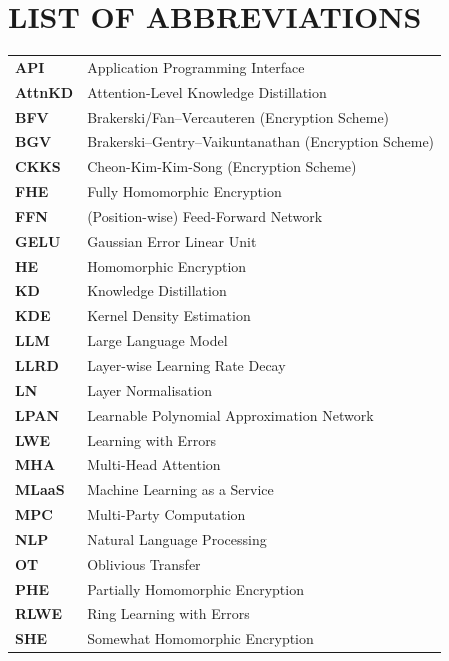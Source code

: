 \chapter*{LIST OF ABBREVIATIONS}
\vspace{2\baselineskip}

\noindent
\begin{tabular}{@{}p{3cm}p{11.5cm}@{}}
\textbf{API}   & Application Programming Interface \\
\textbf{AttnKD} & Attention-Level Knowledge Distillation \\
\textbf{BFV}   & Brakerski/Fan--Vercauteren (Encryption Scheme) \\
\textbf{BGV}   & Brakerski--Gentry--Vaikuntanathan (Encryption Scheme) \\
\textbf{CKKS}  & Cheon-Kim-Kim-Song (Encryption Scheme) \\
\textbf{FHE}   & Fully Homomorphic Encryption \\
\textbf{FFN}   & (Position-wise) Feed-Forward Network \\
\textbf{GELU}  & Gaussian Error Linear Unit \\
\textbf{HE}    & Homomorphic Encryption \\
\textbf{KD}    & Knowledge Distillation \\
\textbf{KDE}   & Kernel Density Estimation \\
\textbf{LLM}   & Large Language Model \\
\textbf{LLRD}  & Layer-wise Learning Rate Decay \\
\textbf{LN}    & Layer Normalisation \\
\textbf{LPAN}  & Learnable Polynomial Approximation Network \\
\textbf{LWE}   & Learning with Errors \\
\textbf{MHA}   & Multi-Head Attention \\
\textbf{MLaaS} & Machine Learning as a Service \\
\textbf{MPC}   & Multi-Party Computation \\
\textbf{NLP}   & Natural Language Processing \\
\textbf{OT}    & Oblivious Transfer \\
\textbf{PHE}   & Partially Homomorphic Encryption \\
\textbf{RLWE}  & Ring Learning with Errors \\
\textbf{SHE}   & Somewhat Homomorphic Encryption \\

\end{tabular}

